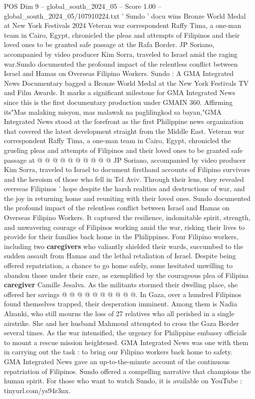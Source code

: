 \begin{textsample}{POS Dim 9 – global\_south\_2024\_05 – Score 1.00 – global\_south\_2024\_05/107910224.txt}  \label{ex:f9_pos_127}
' Sundo ' docu wins Bronze World Medal at New York Festivals 2024 Veteran war correspondent Raffy Tima, a one-man team in Cairo, Egypt, chronicled the pleas and attempts of Filipinos and their loved ones to be granted safe passage at the Rafa Border.
JP Soriano, accompanied by video producer Kim Sorra, traveled to Israel amid the raging war.Sundo documented the profound impact of the relentless conflict between Israel and Hamas on Overseas Filipino Workers.
Sundo : A GMA Integrated News Documentary bagged a Bronze World Medal at the New York Festivals TV and Film Awards.
It marks a significant milestone for GMA Integrated News since this is the first documentary production under GMAIN 360.
Affirming its"Mas malaking misyon, mas malawak na paglilingkod sa bayan,"GMA Integrated News stood at the forefront as the first Philippine news organization that covered the latest development straight from the Middle East.
Veteran war correspondent Raffy Tima, a one-man team in Cairo, Egypt, chronicled the grueling pleas and attempts of Filipinos and their loved ones to be granted safe passage at @ @ @ @ @ @ @ @ @ @ JP Soriano, accompanied by video producer Kim Sorra, traveled to Israel to document firsthand accounts of Filipino survivors and the heroism of those who fell in Tel Aviv.
Through their lens, they revealed overseas Filipinos ' hope despite the harsh realities and destructions of war, and the joy in returning home and reuniting with their loved ones.
Sundo documented the profound impact of the relentless conflict between Israel and Hamas on Overseas Filipino Workers.
It captured the resilience, indomitable spirit, strength, and unwavering courage of Filipinos working amid the war, risking their lives to provide for their families back home in the Philippines.
Four Filipino workers, including two \textbf{caregivers} who valiantly shielded their wards, succumbed to the sudden assault from Hamas and the lethal retaliation of Israel.
Despite being offered repatriation, a chance to go home safely, some hesitated unwilling to abandon those under their care, as exemplified by the courageous plea of Filipina \textbf{caregiver} Camille Jesalva.
As the militants stormed their dwelling place, she offered her savings @ @ @ @ @ @ @ @ @ @.
In Gaza, over a hundred Filipinos found themselves trapped, their desperation imminent.
Among them is Nadia Alzanki, who still mourns the loss of 27 relatives who all perished in a single airstrike.
She and her husband Mahmoud attempted to cross the Gaza Border several times.
As the war intensified, the urgency for Philippine embassy officials to mount a rescue mission heightened.
GMA Integrated News was one with them in carrying out the task : to bring our Filipino workers back home to safety.
GMA Integrated News gave an up-to-the-minute account of the continuous repatriation of Filipinos.
Sundo offered a compelling narrative that champions the human spirit.
For those who want to watch Sundo, it is available on YouTube : tinyurl.com/ys94r3nx.

\end{textsample}

